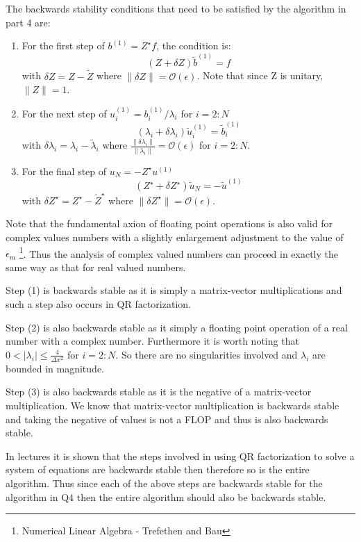 \documentclass{article}
\begin{document}
The backwards stability conditions that need to be satisfied by the algorithm in part 4 are:

\begin{enumerate}
	\item For the first step of $b^{(1)} = Z^\star f$, the condition is: $$ (Z + \delta Z) \tilde b^{(1)} = f $$ with $\delta Z = Z - \tilde Z$ where $ \| \delta Z \| = \mathcal{O}(\epsilon) $. Note that since Z is unitary, $\| Z \| = 1$.
	\item For the next step of $u^{(1)}_i = b^{(1)}_i / \lambda_i$ for $i = 2:N$ $$ (\lambda_i + \delta \lambda_i) \tilde u^{(1)}_i = \tilde b^{(1)}_i $$ with $ \delta \lambda_i = \lambda_i - \tilde \lambda_i $ where $\frac{\|\delta \lambda_i\|}{\|\lambda_i\|} = \mathcal{O}(\epsilon)$ for $i=2:N$.
	\item For the final step of $u_N = - Z^\star u^{(1)}$ $$ (Z^\star + \delta Z^\star) \tilde u_N = - \tilde u^{(1)} $$ with $\delta Z^\star = Z^\star - \tilde Z^\star$ where $ \| \delta Z^\star \| = \mathcal{O}(\epsilon) $.
\end{enumerate}

Note that the fundamental axion of floating point operations is also valid for complex values numbers with a slightly enlargement adjustment to the value of $\epsilon_m$ \footnote{Numerical Linear Algebra - Trefethen and Bau}. Thus the analysis of complex valued numbers can proceed in exactly the same way as that for real valued numbers.

Step (1) is backwards stable as it is simply a matrix-vector multiplications and such a step also occurs in QR factorization. 

Step (2) is also backwards stable as it simply a floating point operation of a real number with a complex number. Furthermore it is worth noting that $0 < |\lambda_i| \leq \frac{4}{\Delta x^2}$ for $i = 2:N$. So there are no singularities involved and $\lambda_i$ are bounded in magnitude.

Step (3) is also backwards stable as it is the negative of a matrix-vector multiplication. We know that matrix-vector multiplication is backwards stable and taking the negative of values is not a FLOP and thus is also backwards stable.

In lectures it is shown that  the steps involved in using QR factorization to solve a system of equations are backwards stable then therefore so is the entire algorithm. Thus since each of the above steps are backwards stable for the algorithm in Q4 then the entire algorithm should also be backwards stable. 
\end{document}
